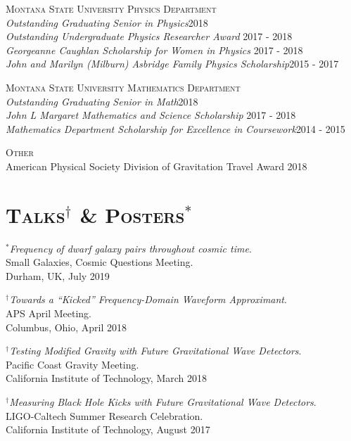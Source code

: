 \documentclass[margin]{res}
\begin{document}
\begin{resume}
{\textsc{Montana State University Physics Department}}\\
{\sl Outstanding Graduating Senior in Physics}\hfill	2018\\
{\sl Outstanding Undergraduate Physics Researcher Award} \hfill        2017 - 2018  \\
{\sl Georgeanne Caughlan Scholarship for Women in Physics} \hfill        2017 - 2018 \\
{\sl John and Marilyn (Milburn) Asbridge Family Physics Scholarship}\hfill		2015 - 2017

{\textsc{Montana State University Mathematics Department}}\\
{\sl Outstanding Graduating Senior in Math}\hfill	2018\\
{\sl John L Margaret Mathematics and Science Scholarship} \hfill        2017 - 2018 \\
{\sl Mathematics Department Scholarship for Excellence in Coursework}\hfill 		2014 - 2015

{\textsc{Other}}\\
American Physical Society Division of Gravitation Travel Award \hfill 2018



\bigskip

\section{\textsc{Talks$^{\dagger}$ \& Posters$^{*}$}}
\emph{${}^{*}$Frequency of dwarf galaxy pairs throughout cosmic time}. \\
Small Galaxies, Cosmic Questions Meeting.\\  
Durham, UK, July 2019

\emph{${}^{\dagger}$Towards a ``Kicked'' Frequency-Domain Waveform Approximant}. \\
APS April Meeting.\\  
Columbus, Ohio, April 2018

\emph{${}^{\dagger}$Testing Modified Gravity with Future Gravitational Wave Detectors}. \\
Pacific Coast Gravity Meeting.\\  
California Institute of Technology, March 2018

\emph{${}^{\dagger}$Measuring Black Hole Kicks with Future Gravitational Wave Detectors}. \\
LIGO-Caltech Summer Research Celebration.\\  
California Institute of Technology, August 2017


\end{resume}
\end{document}
